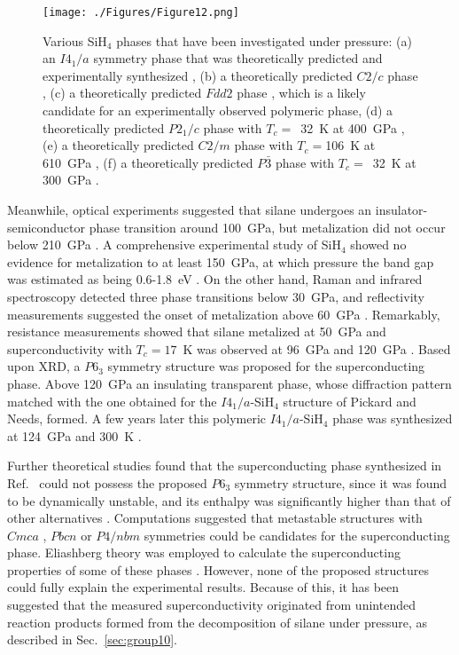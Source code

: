 \documentclass[12pt,letterpaper,oneside]{article}
\begin{document}
\begin{figure}[h!]
\begin{center}
\texttt{[image: ./Figures/Figure12.png]}
\end{center}
\caption{Various SiH$_4$ phases that have been investigated under pressure: (a) an $I4_1/a$ symmetry phase that was theoretically predicted  \cite{Pickard:2006a} and experimentally synthesized \cite{Hanfland:2011-Si}, (b) a theoretically predicted $C2/c$ phase \cite{Pickard:2006a}, (c) a theoretically predicted $Fdd2$ phase \cite{Kurzydlowski:2011a}, which is a likely candidate for an experimentally observed polymeric phase, (d) a theoretically predicted $P2_1/c$ phase with $T_c=$~32~K at 400~GPa \cite{Zhang:2015-Si}, (e) a theoretically predicted $C2/m$ phase with $T_c=$106~K at 610~GPa \cite{Zhang:2015-Si}, (f) a theoretically predicted $P\bar{3}$ phase with $T_c=$~32~K at 300~GPa \cite{Cui:2015-Si}.}
\label{fig:silane}
\end{figure}


Meanwhile, optical experiments suggested that silane undergoes an insulator-semiconductor phase transition around 100~GPa, but metalization did not occur below 210~GPa \cite{Sun:2006-Si}.  A comprehensive experimental study of SiH$_4$ showed no evidence for metalization to at least 150~GPa, at which pressure the band gap was estimated as being 0.6-1.8~eV \cite{Strobel:2011-Si}. On the other hand, Raman and infrared spectroscopy detected three phase transitions below 30~GPa, and reflectivity measurements suggested the onset of metalization above 60~GPa \cite{Chen:2008-Si}. Remarkably, resistance measurements showed that silane metalized at 50~GPa and superconductivity with $T_c=17$~K was observed at 96~GPa and 120~GPa \cite{Eremets:2008a}. Based upon XRD, a $P6_3$ symmetry structure was proposed for the superconducting phase. Above 120~GPa an insulating transparent phase, whose diffraction pattern matched with the one obtained for the $I4_1/a$-SiH$_4$ structure of Pickard and Needs, formed. A few years later this polymeric $I4_1/a$-SiH$_4$ phase was synthesized at 124~GPa and 300~K \cite{Hanfland:2011-Si}. 


Further theoretical studies found that the superconducting phase  synthesized in Ref.\ \cite{Eremets:2008a} could not possess the proposed $P6_3$ symmetry structure, since it was found to be dynamically unstable, and its enthalpy was significantly higher than that of other alternatives \cite{Chen:2008-2-Si,Kim:2008-Si,Martinez-Canales:2009-Si,Yan:2010-Si}. Computations suggested that metastable structures with $Cmca$ \cite{Chen:2008-2-Si}, $Pbcn$ \cite{Martinez-Canales:2009-Si} or $P4/nbm$ \cite{Kim:2008-Si} symmetries could be candidates for the superconducting phase. Eliashberg theory was employed to calculate the superconducting properties of some of these phases \cite{Wei:2010-Si,Szczkesniak:2013-2-Si,Durajski:2014-Si}. However, none of the proposed structures could fully explain the experimental results. Because of this, it has been suggested that the measured superconductivity originated from unintended reaction products formed from the decomposition of silane under pressure, as described in Sec.\ \ref{sec:group10}.
\end{document}
